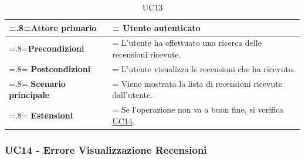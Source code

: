            \begin{table}[H]
                \centering
                \renewcommand{\arraystretch}{1.8}
                \renewcommand\tabularxcolumn[1]{m{#1}}
                \begin{tabularx}{0.9\textwidth} {
                    >{\hsize=.8\hsize\linewidth=\hsize}X
                    >{\hsize=1.2\hsize\linewidth=\hsize}X}
                    \hline
                    \textbf{Attore primario} & Utente autenticato \\
                    \hline
                    \textbf{Precondizioni} & L'utente ha effettuato una ricerca delle recensioni ricevute. \\
                    \hline
                    \textbf{Postcondizioni} & L'utente visualizza le recensioni che ha ricevuto. \\
                    \hline
                    \textbf{Scenario principale} & Viene mostrata la lista di recensioni ricevute dall'utente. \\
                    \hline
                    \textbf{Estensioni} & Se l'operazione non va a buon fine, si verifica \hyperref[UC14]{UC14}. \\
                    \hline
                \end{tabularx}
                \caption{UC13}
            \end{table}

        \subsubsection{UC14 - Errore Visualizzazione Recensioni}
        \label{UC14}

